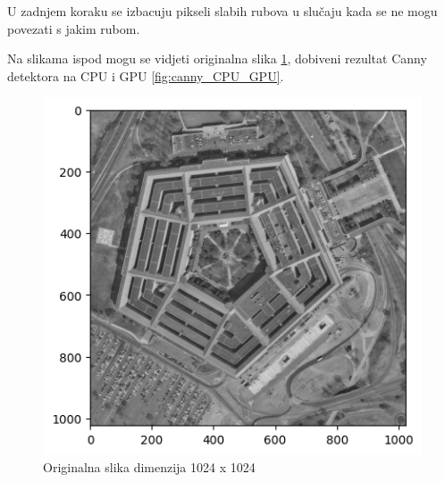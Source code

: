 \documentclass[a4paper,twocolumn]{article}
\begin{document}
	U zadnjem koraku se izbacuju pikseli slabih rubova u slučaju kada se ne mogu povezati s jakim rubom.
	
	Na slikama ispod mogu se vidjeti originalna slika \ref{fig:canny_original}, dobiveni rezultat Canny detektora na CPU i GPU \ref{fig:canny_CPU_GPU}.
	
	\begin{figure}[H]
		\centering
		\includegraphics[width=0.9\linewidth]{slike/canny_original.png} 
		\caption{Originalna slika dimenzija 1024 x 1024}
		\label{fig:canny_original}
	\end{figure} 
	
\end{document}
